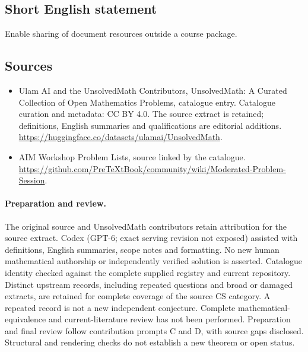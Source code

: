 \documentclass[11pt]{article}
\begin{document}
\subsection{Short English statement}
Enable sharing of document resources outside a course package.
\subsection{Sources}
\begin{itemize}
\item[\hypertarget{source:statement:1}{S1}] Ulam AI and the UnsolvedMath Contributors, UnsolvedMath: A Curated Collection of Open Mathematics Problems, catalogue entry. Catalogue curation and metadata: CC BY 4.0. The source extract is retained; definitions, English summaries and qualifications are editorial additions.
\url{https://huggingface.co/datasets/ulamai/UnsolvedMath}.
\item[\hypertarget{source:statement:2}{S2}] AIM Workshop Problem Lists, source linked by the catalogue.
\url{https://github.com/PreTeXtBook/community/wiki/Moderated-Problem-Session}.
\end{itemize}
\paragraph{Preparation and review.}
The original source and UnsolvedMath contributors retain attribution for the source extract. Codex (GPT-6; exact serving revision not exposed) assisted with definitions, English summaries, scope notes and formatting. No new human mathematical authorship or independently verified solution is asserted. Catalogue identity checked against the complete supplied registry and current repository. Distinct upstream records, including repeated questions and broad or damaged extracts, are retained for complete coverage of the source CS category. A repeated record is not a new independent conjecture. Complete mathematical-equivalence and current-literature review has not been performed. Preparation and final review follow contribution prompts C and D, with source gaps disclosed. Structural and rendering checks do not establish a new theorem or open status.
\label{end:statement}
\end{document}

